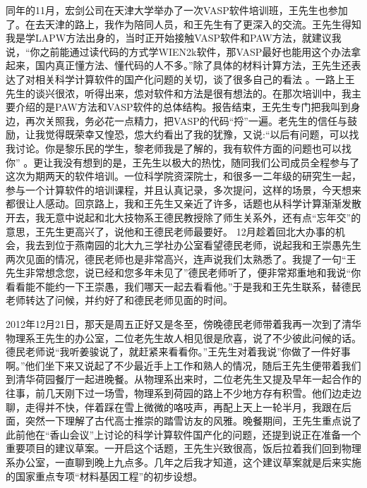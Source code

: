同年的11月，宏剑公司在天津大学举办了一次\textrm{VASP}软件培训班，王先生也参加了。在去天津的路上，我作为陪同人员，和王先生有了更深入的交流。王先生得知我是学\textrm{LAPW}方法出身的，当时正开始接触\textrm{VASP}软件和\textrm{PAW}方法，就建议我说，``你之前能通过读代码的方式学\textrm{WIEN2k}软件，那\textrm{VASP}最好也能用这个办法拿起来，国内真正懂方法、懂代码的人不多。''除了具体的材料计算方法，王先生还表达了对相关科学计算软件的国产化问题的关切，谈了很多自己的看法%
。一路上王先生的谈兴很浓，听得出来，怹对软件和方法是很有想法的。在那次培训中，我主要介绍的是\textrm{PAW}方法和\textrm{VASP}软件的总体结构。报告结束，王先生专门把我叫到身边，再次关照我，务必花一点精力，把\textrm{VASP}的代码``捋''一遍。老先生的信任与鼓励，让我觉得既荣幸又惶恐，怹大约看出了我的犹豫，又说:``以后有问题，可以找我讨论。你是黎乐民的学生，黎老师我是了解的，我有软件方面的问题也可以找你''%
。更让我没有想到的是，王先生以极大的热忱，随同我们公司成员全程参与了这次为期两天的软件培训。一位科学院资深院士，和很多一二年级的研究生一起，参与一个计算软件的培训课程，并且认真记录，多次提问，这样的场景，今天想来都很让人感动。回京路上，我和王先生又亲近了许多，话题也从科学计算渐渐发散开去，我无意中说起和北大技物系王德民教授除了师生关系外，还有点``忘年交''的意思，王先生更高兴了，说他和王德民老师最要好。%
12月趁着回北大办事的机会，我去到位于燕南园的北大九三学社办公室看望德民老师，说起我和王崇愚先生两次见面的情况，德民老师也是非常高兴，连声说我们太熟悉了。我提了一句``王先生非常想念您，说已经和您多年未见了''德民老师听了，便非常郑重地和我说``你看看能不能约一下王崇愚，我们哪天一起去看看他。''于是我和王先生联系，替德民老师转达了问候，并约好了和德民老师见面的时间。

2012年12月21日，那天是周五正好又是冬至，傍晚德民老师带着我再一次到了清华物理系王先生的办公室，二位老先生故人相见很是欣喜，说了不少彼此问候的话。德民老师说``我听姜骏说了，就赶紧来看看你。''王先生对着我说''你做了一件好事啊。''他们坐下来又说起了不少最近手上工作和熟人的情况，随后王先生便带着我们到清华荷园餐厅一起进晚餐。从物理系出来时，二位老先生又提及早年一起合作的往事，前几天刚下过一场雪，物理系到荷园的路上不少地方存有积雪。他们边走边聊，走得并不快，伴着踩在雪上微微的咯吱声，再配上天上一轮半月，我跟在后面，突然一下理解了古代高士推崇的踏雪访友的风雅。晚餐期间，王先生重点说了此前他在``香山会议''上讨论的科学计算软件国产化的问题，还提到说正在准备一个重要项目的建议草案。一开启这个话题，王先生兴致很高，饭后拉着我们回到物理系办公室，一直聊到晚上九点多。几年之后我才知道，这个建议草案就是后来实施的国家重点专项``材料基因工程''的初步设想。

